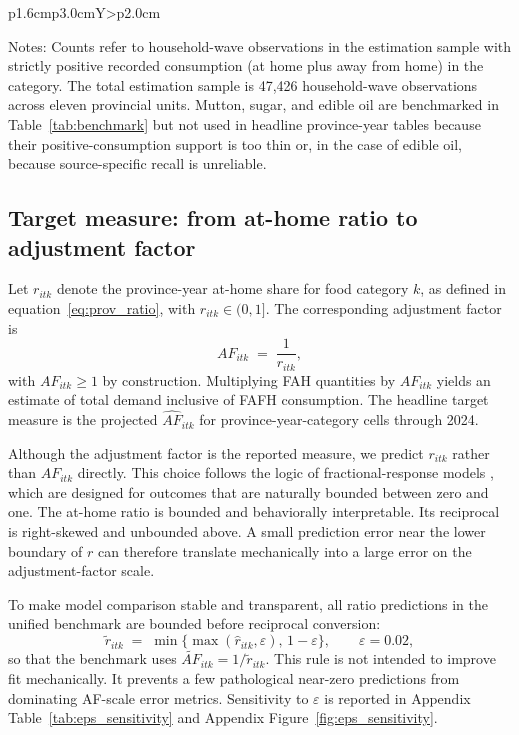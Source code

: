 \documentclass[preprint,12pt,authoryear]{elsarticle}
\begin{document}
\begin{table}[htbp]
\begin{threeparttable}
\begin{tabularx}{\textwidth}{p{1.6cm}p{3.0cm}Y>{\raggedleft\arraybackslash}p{2.0cm}}
\bottomrule
\end{tabularx}
\begin{tablenotes}[flushleft]
\scriptsize
\item Notes: Counts refer to household-wave observations in the estimation sample with strictly positive recorded consumption (at home plus away from home) in the category. The total estimation sample is 47,426 household-wave observations across eleven provincial units. Mutton, sugar, and edible oil are benchmarked in Table~\ref{tab:benchmark} but not used in headline province-year tables because their positive-consumption support is too thin or, in the case of edible oil, because source-specific recall is unreliable.
\end{tablenotes}
\end{threeparttable}
\end{table}

\subsection{Target measure: from at-home ratio to adjustment factor}
\label{subsec:bounded}

Let $r_{itk}$ denote the province-year at-home share for food category $k$, as defined in equation~\eqref{eq:prov_ratio}, with $r_{itk}\in(0,1]$. The corresponding adjustment factor is
\begin{equation}
AF_{itk} \;=\; \frac{1}{r_{itk}},
\label{eq:AFdef}
\end{equation}
with $AF_{itk}\geq 1$ by construction. Multiplying FAH quantities by $AF_{itk}$ yields an estimate of total demand inclusive of FAFH consumption. The headline target measure is the projected $\widehat{AF}_{itk}$ for province-year-category cells through 2024.

Although the adjustment factor is the reported measure, we predict $r_{itk}$ rather than $AF_{itk}$ directly. This choice follows the logic of fractional-response models \citep{PapkeWooldridge1996, FerrariCribari2004}, which are designed for outcomes that are naturally bounded between zero and one. The at-home ratio is bounded and behaviorally interpretable. Its reciprocal is right-skewed and unbounded above. A small prediction error near the lower boundary of $r$ can therefore translate mechanically into a large error on the adjustment-factor scale.

To make model comparison stable and transparent, all ratio predictions in the unified benchmark are bounded before reciprocal conversion:
\begin{equation}
\tilde{r}_{itk} \;=\; \min\!\bigl\{\max(\hat r_{itk},\varepsilon),\,1-\varepsilon\bigr\},\qquad \varepsilon=0.02,
\label{eq:boundedratio}
\end{equation}
so that the benchmark uses $\widetilde{AF}_{itk}=1/\tilde{r}_{itk}$. This rule is not intended to improve fit mechanically. It prevents a few pathological near-zero predictions from dominating AF-scale error metrics. Sensitivity to $\varepsilon$ is reported in Appendix Table~\ref{tab:eps_sensitivity} and Appendix Figure~\ref{fig:eps_sensitivity}.
\end{document}
